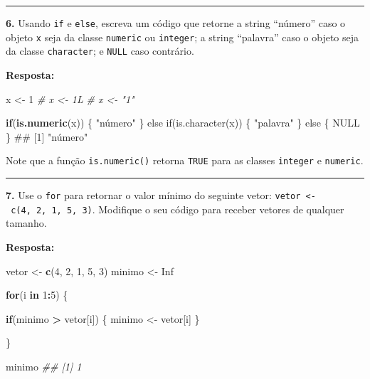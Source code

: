 \documentclass[
]{book}
\newenvironment{Shaded}{\begin{snugshade}}{\end{snugshade}}
\newcommand{\CommentTok}[1]{\textcolor[rgb]{0.56,0.35,0.01}{\textit{#1}}}
\newcommand{\ControlFlowTok}[1]{\textcolor[rgb]{0.13,0.29,0.53}{\textbf{#1}}}
\newcommand{\DecValTok}[1]{\textcolor[rgb]{0.00,0.00,0.81}{#1}}
\newcommand{\KeywordTok}[1]{\textcolor[rgb]{0.13,0.29,0.53}{\textbf{#1}}}
\newcommand{\NormalTok}[1]{#1}
\newcommand{\OperatorTok}[1]{\textcolor[rgb]{0.81,0.36,0.00}{\textbf{#1}}}
\newcommand{\OtherTok}[1]{\textcolor[rgb]{0.56,0.35,0.01}{#1}}
\newcommand{\StringTok}[1]{\textcolor[rgb]{0.31,0.60,0.02}{#1}}
\begin{document}
\begin{center}\rule{0.5\linewidth}{0.5pt}\end{center}

\textbf{6.} Usando \texttt{if} e \texttt{else}, escreva um código que retorne a string ``número'' caso o objeto \texttt{x} seja da classe \texttt{numeric} ou \texttt{integer}; a string ``palavra'' caso o objeto seja da classe \texttt{character}; e \texttt{NULL} caso contrário.

\textbf{Resposta:}

\begin{Shaded}
\begin{Highlighting}[]
\NormalTok{x <-}\StringTok{ }\DecValTok{1}
\CommentTok{# x <- 1L}
\CommentTok{# x <- "1"}

\ControlFlowTok{if}\NormalTok{(}\KeywordTok{is.numeric}\NormalTok{(x)) \{}
  \StringTok{"número"}
\StringTok{\} else if(is.character(x)) \{}
\StringTok{  "}\NormalTok{palavra}\StringTok{"}
\StringTok{\} else \{ }
\StringTok{  NULL}
\StringTok{\}}
\StringTok{## [1] "}\NormalTok{número"}
\end{Highlighting}
\end{Shaded}

Note que a função \texttt{is.numeric()} retorna \texttt{TRUE} para as classes \texttt{integer} e \texttt{numeric}.

\begin{center}\rule{0.5\linewidth}{0.5pt}\end{center}

\textbf{7.} Use o \texttt{for} para retornar o valor mínimo do seguinte vetor: \texttt{vetor\ \textless{}-\ c(4,\ 2,\ 1,\ 5,\ 3)}. Modifique o seu código para receber vetores de qualquer tamanho.

\textbf{Resposta:}

\begin{Shaded}
\begin{Highlighting}[]

\NormalTok{vetor <-}\StringTok{ }\KeywordTok{c}\NormalTok{(}\DecValTok{4}\NormalTok{, }\DecValTok{2}\NormalTok{, }\DecValTok{1}\NormalTok{, }\DecValTok{5}\NormalTok{, }\DecValTok{3}\NormalTok{)}
\NormalTok{minimo <-}\StringTok{ }\OtherTok{Inf}

\ControlFlowTok{for}\NormalTok{(i }\ControlFlowTok{in} \DecValTok{1}\OperatorTok{:}\DecValTok{5}\NormalTok{) \{}
  
  \ControlFlowTok{if}\NormalTok{(minimo }\OperatorTok{>}\StringTok{ }\NormalTok{vetor[i]) \{}
\NormalTok{    minimo <-}\StringTok{ }\NormalTok{vetor[i]}
\NormalTok{  \}}
  
\NormalTok{\}}

\NormalTok{minimo}
\CommentTok{## [1] 1}
\end{Highlighting}
\end{Shaded}
\end{document}
